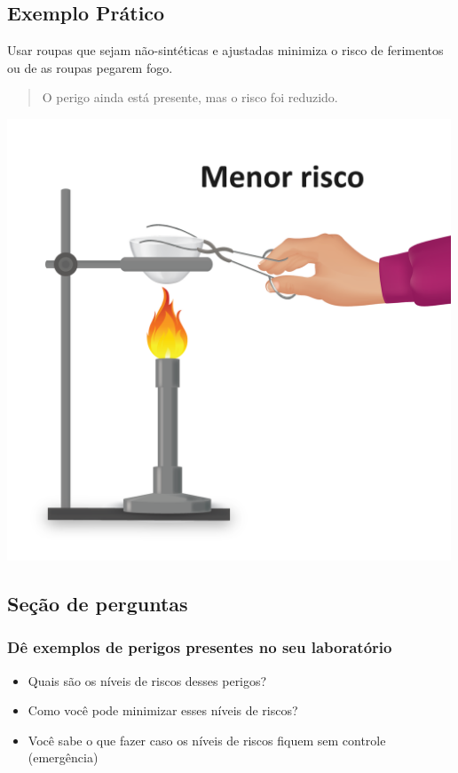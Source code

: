 \documentclass[
  letterpaper,
  DIV=11,
  numbers=noendperiod]{scrartcl}
\providecommand{\tightlist}{%
  \setlength{\itemsep}{0pt}\setlength{\parskip}{0pt}}\usepackage{longtable,booktabs,array}
\begin{document}
\subsection{Exemplo Prático}\label{exemplo-pruxe1tico-1}

Usar roupas que sejam não-sintéticas e ajustadas minimiza o risco de
ferimentos ou de as roupas pegarem fogo.

\begin{quote}
O perigo ainda está presente, mas o risco foi reduzido.
\end{quote}

\includegraphics[width=5.20833in,height=\textheight,keepaspectratio]{imagens/image_4.b26a4074.png}

\subsection{Seção de perguntas}\label{seuxe7uxe3o-de-perguntas}

\subsubsection{Dê exemplos de perigos presentes no seu
laboratório}\label{duxea-exemplos-de-perigos-presentes-no-seu-laboratuxf3rio}

\begin{itemize}
\tightlist
\item
  Quais são os níveis de riscos desses perigos?
\item
  Como você pode minimizar esses níveis de riscos?
\item
  Você sabe o que fazer caso os níveis de riscos fiquem sem controle
  (emergência)
\end{itemize}
\end{document}
